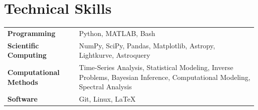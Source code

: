 \section{Technical Skills}

{%
\renewcommand{\arraystretch}{0.92}
\begin{tabularx}{\linewidth}{@{}lX@{}}
\textbf{Programming} &
Python, MATLAB, Bash \\

\textbf{Scientific Computing} &
NumPy, SciPy, Pandas, Matplotlib, Astropy, Lightkurve, Astroquery \\

\textbf{Computational Methods} &
Time-Series Analysis, Statistical Modeling, Inverse Problems,
Bayesian Inference, Computational Modeling, Spectral Analysis \\

\textbf{Software} &
Git, Linux, \LaTeX
\end{tabularx}
}